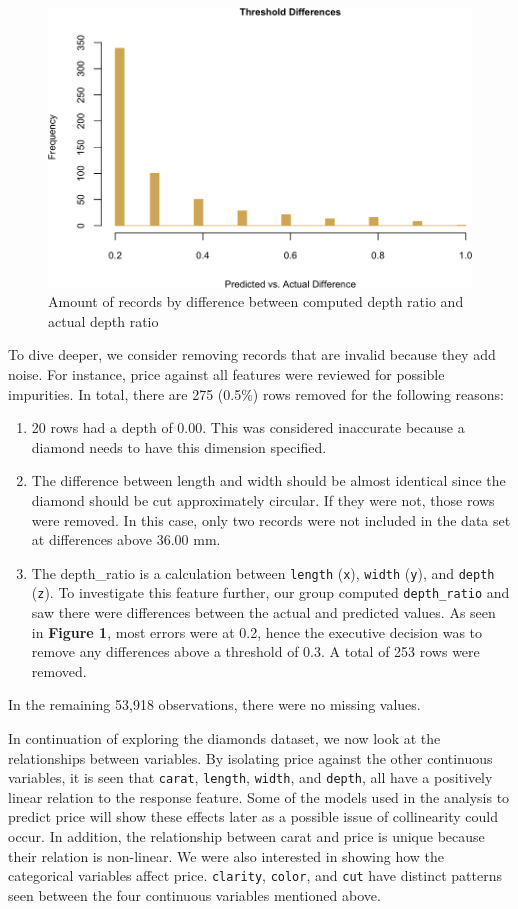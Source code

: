 \documentclass[
  paper=a4,
  ,captions=tableheading
]{scrartcl}
\begin{document}
\begin{figure}[H]

{\centering \includegraphics[width=0.5\linewidth,]{Diamonds_PDF_files/figure-latex/threshold diff hist-1}

}

\caption{Amount of records by difference between computed depth ratio and actual depth ratio}\label{fig:threshold diff hist}
\end{figure}

To dive deeper, we consider removing records that are invalid because
they add noise. For instance, price against all features were reviewed
for possible impurities. In total, there are 275 (0.5\%) rows removed
for the following reasons:

\begin{enumerate}
\def\labelenumi{\arabic{enumi}.}
\item
  20 rows had a depth of 0.00. This was considered inaccurate because a
  diamond needs to have this dimension specified.
\item
  The difference between length and width should be almost identical
  since the diamond should be cut approximately circular. If they were
  not, those rows were removed. In this case, only two records were not
  included in the data set at differences above 36.00 mm.
\item
  The depth\_ratio is a calculation between \texttt{length}
  (\texttt{x}), \texttt{width} (\texttt{y}), and \texttt{depth}
  (\texttt{z}). To investigate this feature further, our group computed
  \texttt{depth\_ratio} and saw there were differences between the
  actual and predicted values. As seen in \textbf{Figure 1}, most errors
  were at 0.2, hence the executive decision was to remove any
  differences above a threshold of 0.3. A total of 253 rows were
  removed.
\end{enumerate}

In the remaining 53,918 observations, there were no missing values.

In continuation of exploring the diamonds dataset, we now look at the
relationships between variables. By isolating price against the other
continuous variables, it is seen that \texttt{carat}, \texttt{length},
\texttt{width}, and \texttt{depth}, all have a positively linear
relation to the response feature. Some of the models used in the
analysis to predict price will show these effects later as a possible
issue of collinearity could occur. In addition, the relationship between
carat and price is unique because their relation is non-linear. We were
also interested in showing how the categorical variables affect price.
\texttt{clarity}, \texttt{color}, and \texttt{cut} have distinct
patterns seen between the four continuous variables mentioned above.
\end{document}

